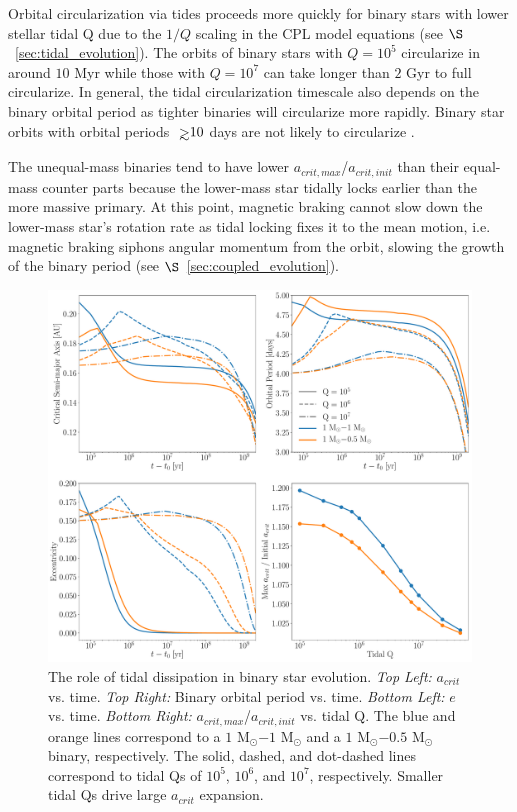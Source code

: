 Orbital circularization via tides proceeds more quickly for binary stars with lower stellar tidal Q due to the $1/Q$ scaling in the CPL model equations (see $\S$~\ref{sec:tidal_evolution}).  The orbits of binary stars with $Q = 10^5$ circularize in around $10$ Myr while those with $Q = 10^7$ can take longer than $2$ Gyr to full circularize.  In general, the tidal circularization timescale also depends on the binary orbital period as tighter binaries will circularize more rapidly.  Binary star orbits with orbital periods $\gsim 10$ days are not likely to circularize \citep[e.g.][]{Zahn1989,Meibom2005,Raghavan2010,Lurie2017}.

The unequal-mass binaries tend to have lower $a_{crit,max}$/$a_{crit,init}$ than their equal-mass counter parts because the lower-mass star tidally locks earlier than the more massive primary.  At this point, magnetic braking cannot slow down the lower-mass star's rotation rate as tidal locking fixes it to the mean motion, i.e. magnetic braking siphons angular momentum from the orbit, slowing the growth of the binary period (see $\S$~\ref{sec:coupled_evolution}).

\begin{figure}[t]
	\includegraphics[width=\textwidth]{var_Q.pdf}
    \caption{The role of tidal dissipation in binary star evolution. {\it Top Left:} $a_{crit}$ vs. time.  {\it Top Right:} Binary orbital period vs. time. {\it Bottom Left:} $e$ vs. time. {\it Bottom Right:} $a_{crit,max}$/$a_{crit,init}$ vs. tidal Q.  The blue and orange lines correspond to a $1$ M$_{\odot}$$-1$ M$_{\odot}$ and a $1$ M$_{\odot}$$-0.5$ M$_{\odot}$ binary, respectively.  The solid, dashed, and dot-dashed lines correspond to tidal Qs of $10^5$, $10^6$, and $10^7$, respectively.  Smaller tidal Qs drive large $a_{crit}$ expansion.}
    \label{fig:var_Q}
\end{figure}

